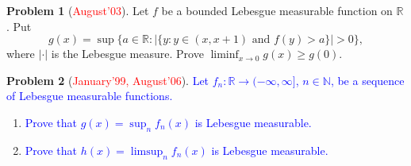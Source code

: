\documentclass[12pt]{amsart}
\def\field#1{\mathbb{#1}}
\def\abs#1{\lvert {#1} \rvert}
\theoremstyle{definition}
\newtheorem{problem}{Problem}
\theoremstyle{remark}
\begin{document}
\begin{problem}[\textcolor{red}{August'03}]
  Let $f$ be a bounded Lebesgue measurable function on $\field{R}$.
  Put
  \begin{equation*}
    g(x) = \sup \big\{ a \in \field{R} : \abs{ \{ y : y \in (x,x+1)
    \text{ and } f(y) > a \} } > 0 \big\},
  \end{equation*}
  where $\abs{\cdot}$ is the Lebesgue measure.  Prove $\liminf_{x\to
    0} g(x) \geq g(0)$.
\end{problem}
\begin{problem}[\textcolor{red}{January'99, August'06}]
  \textcolor{blue}{Let $f_n \colon \field{R} \to (-\infty, \infty]$,
    $n \in \field{N}$, be a sequence of Lebesgue measurable
    functions.}
  \begin{enumerate}
  \item \textcolor{blue}{Prove that $g(x) = \sup_n f_n(x)$ is Lebesgue
      measurable.}
  \item \textcolor{blue}{Prove that $h(x) = \limsup_n f_n(x)$ is
      Lebesgue measurable.}
  \end{enumerate}
\end{problem}
\end{document}

